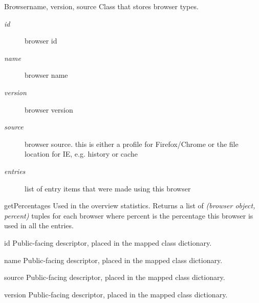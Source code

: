 \documentclass[letterpaper,10pt,english]{manual}
\begin{document}
\hypertarget{webscavator.model.models.Browser}{}\begin{classdesc}{Browser}{name, version, source}
Class that stores browser types.
\begin{description}
\item[\emph{id}]
browser id

\item[\emph{name}]
browser name

\item[\emph{version}]
browser version

\item[\emph{source}]
browser source. this is either a profile for Firefox/Chrome 
or the file location for IE, e.g. history or cache

\item[\emph{entries}]
list of entry items that were made using this browser

\end{description}

\hypertarget{webscavator.model.models.Browser.getPercentages}{}\begin{staticmethoddesc}{getPercentages}{}
Used in the overview statistics. Returns a list of \emph{(browser object, percent)} tuples 
for each browser where percent is the percentage this browser is used in all the entries.
\end{staticmethoddesc}

\hypertarget{webscavator.model.models.Browser.id}{}\begin{memberdesc}{id}
Public-facing descriptor, placed in the mapped class dictionary.
\end{memberdesc}

\hypertarget{webscavator.model.models.Browser.name}{}\begin{memberdesc}{name}
Public-facing descriptor, placed in the mapped class dictionary.
\end{memberdesc}

\hypertarget{webscavator.model.models.Browser.source}{}\begin{memberdesc}{source}
Public-facing descriptor, placed in the mapped class dictionary.
\end{memberdesc}

\hypertarget{webscavator.model.models.Browser.version}{}\begin{memberdesc}{version}
Public-facing descriptor, placed in the mapped class dictionary.
\end{memberdesc}
\end{classdesc}
\end{document}
